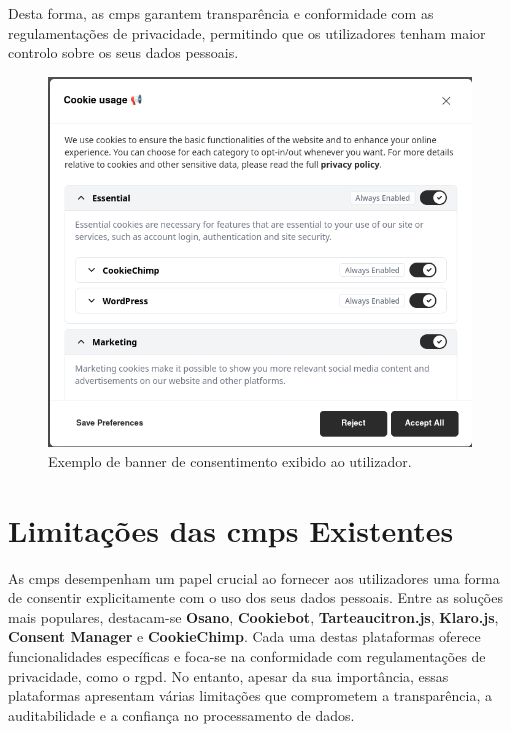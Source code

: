 Desta forma, as \acrshort{cmp}s garantem transparência e conformidade com as regulamentações de privacidade, permitindo que os utilizadores tenham maior controlo sobre os seus dados pessoais.

\begin{figure}[h]
\begin{center}
	\includegraphics[width=1.0\textwidth]{images/banner.png}
\end{center}
\caption{Exemplo de banner de consentimento exibido ao utilizador.}
\label{fig:banner}
\end{figure}

\newpage

\section{Limitações das \acrshort{cmp}s Existentes}

As \acrshort{cmp}s desempenham um papel crucial ao fornecer aos utilizadores uma forma de consentir explicitamente com o uso dos seus dados pessoais. Entre as soluções mais populares, destacam-se \textbf{Osano}, \textbf{Cookiebot}, \textbf{Tarteaucitron.js}, \textbf{Klaro.js}, \textbf{Consent Manager} e \textbf{CookieChimp}. Cada uma destas plataformas oferece funcionalidades específicas e foca-se na conformidade com regulamentações de privacidade, como o \acrshort{rgpd}. No entanto, apesar da sua importância, essas plataformas apresentam várias limitações que comprometem a transparência, a auditabilidade e a confiança no processamento de dados.

